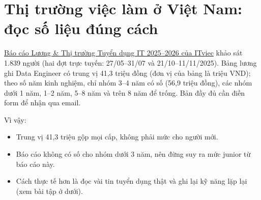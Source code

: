 \documentclass[11pt,a4paper,oneside]{report}
\begin{document}
\section{Thị trường việc làm ở Việt Nam: đọc số liệu đúng cách}
\href{https://itviec.com/bao-cao/luong-it-va-thi-truong-tuyen-dung-it-vietnam}{Báo cáo Lương \& Thị trường Tuyển dụng IT 2025--2026 của ITviec} khảo sát 1.839 người (hai đợt trực tuyến: 27/05--31/07 và 21/10--11/11/2025). Bảng lương ghi Data Engineer có trung vị 41,3 triệu đồng (đơn vị của bảng là triệu VND); theo số năm kinh nghiệm, chỉ nhóm 3--4 năm có số (56,9 triệu đồng), các nhóm dưới 1 năm, 1--2 năm, 5--8 năm và trên 8 năm để trống. Bản đầy đủ cần điền form để nhận qua email.

Vì vậy:
\begin{itemize}
  \item Trung vị 41,3 triệu gộp mọi cấp, không phải mức cho người mới.
  \item Báo cáo không có số cho nhóm dưới 3 năm, nên đừng suy ra mức junior từ báo cáo này.
  \item Cách thực tế hơn là đọc vài tin tuyển dụng thật và ghi lại kỹ năng lặp lại (xem bài tập ở dưới).
\end{itemize}
\end{document}
